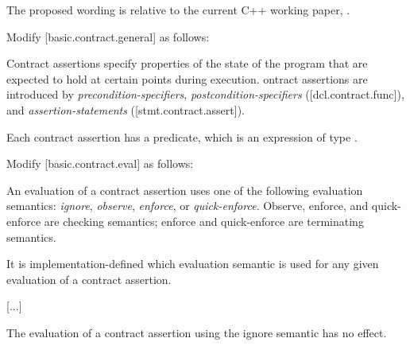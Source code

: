 The proposed wording is relative to the current C++ working paper, \cite{N5008}.

Modify [basic.contract.general] as follows:

\begin{adjustwidth}{0.5cm}{0.5cm}
Contract assertions specify properties of the state of the program
that are expected to hold at certain points during execution. ontract assertions
are introduced by \emph{precondition-specifiers}, \emph{postcondition-specifiers} ([dcl.contract.func]),
and \emph{assertion-statements} ([stmt.contract.assert]). 

Each contract assertion has a predicate, which is an expression of type . 
\begin{note}
\end{note}
\end{adjustwidth}

Modify [basic.contract.eval] as follows:

\begin{adjustwidth}{0.5cm}{0.5cm}
An evaluation of a contract assertion uses one of the following  evaluation semantics: 
\emph{ignore}, 
\emph{observe}, 
\emph{enforce}, or 
\emph{quick-enforce}. 
Observe, enforce, and quick-enforce are checking semantics; enforce and quick-enforce are terminating semantics.

It is implementation-defined which evaluation semantic is used for any given evaluation of a contract assertion.  


[...]

The evaluation of a contract assertion using the ignore  semantic has no effect. 

\end{adjustwidth}


